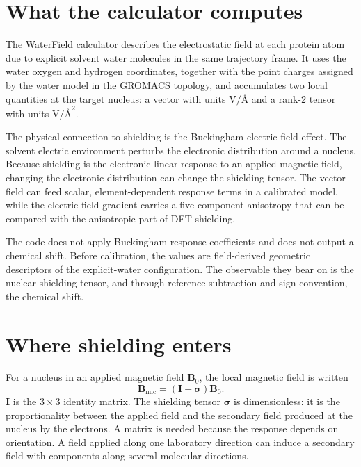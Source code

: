 \documentclass[11pt]{article}
\begin{document}

\section{What the calculator computes}

The WaterField calculator describes the electrostatic field at each protein
atom due to explicit solvent water molecules in the same trajectory frame. It
uses the water oxygen and hydrogen coordinates, together with the point charges
assigned by the water model in the GROMACS topology, and accumulates two local
quantities at the target nucleus: a vector with units
\(\si{\volt\per\angstrom}\) and a rank-2 tensor with units
\(\si{\volt\per\square\angstrom}\).

The physical connection to shielding is the Buckingham electric-field effect.
The solvent electric environment perturbs the electronic distribution around a
nucleus. Because shielding is the electronic linear response to an applied
magnetic field, changing the electronic distribution can change the shielding
tensor. The vector field can feed scalar, element-dependent response terms in a
calibrated model, while the electric-field gradient carries a five-component
anisotropy that can be compared with the anisotropic part of DFT shielding.

The code does not apply Buckingham response coefficients and does not output a
chemical shift. Before calibration, the values are field-derived geometric
descriptors of the explicit-water configuration. The observable they bear on is
the nuclear shielding tensor, and through reference subtraction and sign
convention, the chemical shift.

\section{Where shielding enters}

For a nucleus in an applied magnetic field \(\bm B_0\), the local magnetic field
is written
\begin{equation}
  \bm B_{\mathrm{nuc}}=(\bm I-\bm\sigma)\bm B_0 .
  \label{eq:shielding}
\end{equation}
\(\bm I\) is the \(3\times3\) identity matrix. The shielding tensor
\(\bm\sigma\) is dimensionless: it is the proportionality between the applied
field and the secondary field produced at the nucleus by the electrons. A
matrix is needed because the response depends on orientation. A field applied
along one laboratory direction can induce a secondary field with components
along several molecular directions.
\end{document}
